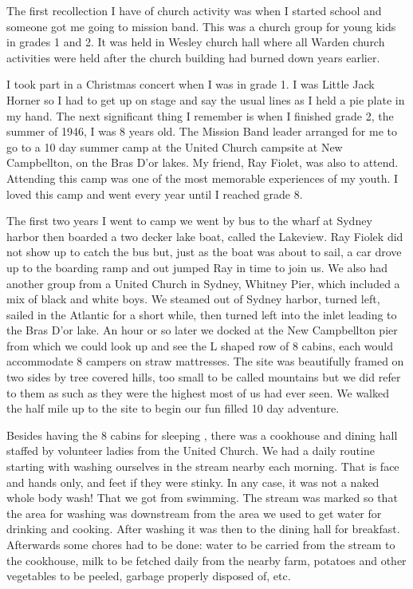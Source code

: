 The first recollection I have of church activity was when I started school and someone got me going to mission band. This was a church group for young kids in grades 1 and 2. It was held in Wesley church hall where all Warden church activities were held after the church building had burned down years earlier.

I took part in a Christmas concert when I was in grade 1. I was Little Jack Horner so I had to get up on stage and say the usual lines as I held a pie plate in my hand. The next significant thing I remember is when I finished grade 2, the summer of 1946, I was 8 years old. The Mission Band leader arranged for me to go to a 10 day summer camp at the United Church campsite at New Campbellton, on the Bras D'or lakes. My friend, Ray Fiolet, was also to attend. Attending this camp was one of the most memorable experiences of my youth. I loved this camp and went every year until I reached grade 8. 

The first two years I went to camp we went by bus to the wharf at Sydney harbor then boarded a two decker lake boat, called the Lakeview. Ray Fiolek did not show up to catch the bus but, just as the boat was about to sail, a car drove up to the boarding ramp and out jumped Ray in time to join us. We also had another group from a United Church in Sydney, Whitney Pier, which included a mix of black and white boys. We steamed out of Sydney harbor, turned left, sailed in the Atlantic for a short while, then turned left into the inlet leading to the Bras D'or lake. An hour or so later we docked at the New Campbellton pier from which we could look up and see the L shaped row of 8 cabins, each would accommodate 8 campers on straw mattresses. The site was beautifully framed on two sides by tree covered hills, too small to be called mountains but we did refer to them as such as they were the highest most of us had ever seen. We walked the half mile up to the site to begin our fun filled 10 day adventure.

Besides having the 8 cabins for sleeping , there was a cookhouse and dining hall staffed by volunteer ladies from the United Church. We had a daily routine starting with washing ourselves in the stream nearby each morning. That is face and hands only, and feet if they were stinky. In any case, it was not a naked whole body wash! That we got from swimming. The stream was marked so that the area for washing was downstream from the area we used to get water for drinking and cooking. After washing it was then to the dining hall for breakfast. Afterwards some chores had to be done: water to be carried from the stream to the cookhouse, milk to be fetched daily from the nearby farm, potatoes and other vegetables to be peeled, garbage properly disposed of, etc.

